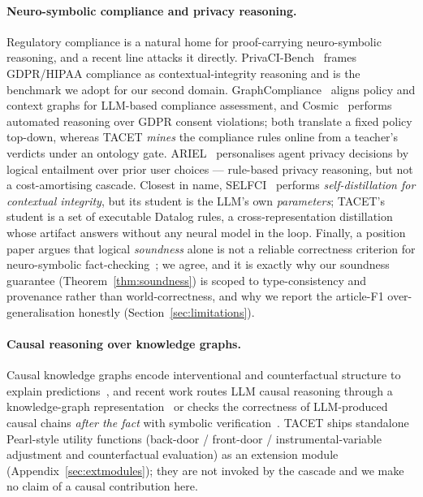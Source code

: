 \documentclass[11pt]{article}
\theoremstyle{plain}
\begin{document}
\paragraph{Neuro-symbolic compliance and privacy reasoning.} Regulatory
compliance is a natural home for proof-carrying neuro-symbolic reasoning, and a
recent line attacks it directly. PrivaCI-Bench~\citep{privacibench2025} frames
GDPR/HIPAA compliance as contextual-integrity reasoning and is the benchmark we
adopt for our second domain. GraphCompliance~\citep{graphcompliance2025} aligns
policy and context graphs for LLM-based compliance assessment, and
Cosmic~\citep{cosmicgdpr2026} performs automated reasoning over GDPR consent
violations; both translate a fixed policy top-down, whereas TACET \emph{mines}
the compliance rules online from a teacher's verdicts under an ontology gate.
ARIEL~\citep{arielprivacy2025} personalises agent privacy decisions by logical
entailment over prior user choices --- rule-based privacy reasoning, but not a
cost-amortising cascade. Closest in name, SELFCI~\citep{selfci2026} performs
\emph{self-distillation for contextual integrity}, but its student is the LLM's
own \emph{parameters}; TACET's student is a set of executable Datalog rules,
a cross-representation distillation whose artifact answers without any neural
model in the loop. Finally, a position paper argues that logical
\emph{soundness} alone is not a reliable correctness criterion for
neuro-symbolic fact-checking~\citep{soundnessnotreliable2026}; we agree, and it
is exactly why our soundness guarantee (Theorem~\ref{thm:soundness}) is scoped
to type-consistency and provenance rather than world-correctness, and why we
report the article-F1 over-generalisation honestly (Section~\ref{sec:limitations}).

\paragraph{Causal reasoning over knowledge graphs.} Causal knowledge graphs
encode interventional and counterfactual structure to explain
predictions~\citep{causalkg2022}, and recent work routes LLM causal
reasoning through a knowledge-graph representation~\citep{causalkgllm2024} or
checks the correctness of LLM-produced causal chains \emph{after the fact}
with symbolic verification~\citep{doverifier2026}. TACET ships standalone
Pearl-style utility functions (back-door / front-door / instrumental-variable
adjustment and counterfactual evaluation) as an extension module
(Appendix~\ref{sec:extmodules}); they are not invoked by the cascade and we
make no claim of a causal contribution here.
\end{document}
